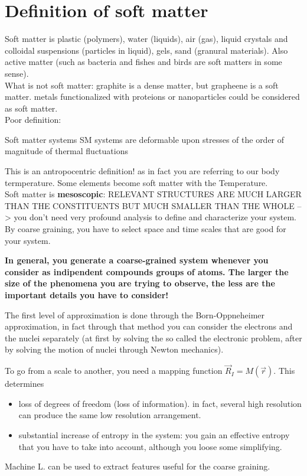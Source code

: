 \chapter{Definition of soft matter}
Soft matter is plastic (polymers), water (liquids), air (gas), liquid crystals
and colloidal suspensions (particles in liquid), gels, sand (granural
materials). Also active matter (such as bacteria and fishes and birds are soft
matters in some sense).\\

What is not soft matter: graphite is a dense matter, but grapheene is a soft
matter. metals functionalized with proteions or nanoparticles could be
considered as soft matter. \\

Poor definition: %
\begin{definition}
    Soft matter systems SM systems are deformable
    upon stresses
    of the order of magnitude
    of thermal fluctuations
    
\end{definition} 
This is an antropocentric definition! as in fact you are referring to our body
termperature. Some elements become soft matter with the Temperature. \\

Soft matter is \textbf{mesoscopic}: RELEVANT STRUCTURES
ARE MUCH LARGER
THAN THE CONSTITUENTS
BUT MUCH SMALLER
THAN THE WHOLE --> you don't need very profound analysis to define and
characterize your system.
By coarse graining, you have to select space and time scales that are good for
your system. \\

\begin{center}
    \textbf{
        In general, you generate a coarse-grained system whenever you consider as
        indipendent compounds groups of atoms. The larger the size of the
        phenomena you are trying to observe, the less are the important details
        you have to consider!
        }    
\end{center}

The first level of approximation is done through the Born-Oppneheimer
approximation, in fact through that method you can consider the electrons and
the nuclei separately (at first by solving the so called the electronic problem,
after by solving the motion of nuclei through Newton mechanics).

To go from a scale to another, you need a mapping function $\vec{R}_I = M(\vec{r})$. This determines
\begin{itemize}
  \item loss of degrees of freedom (loss of information). in fact, several high
  resolution can produce the same low resolution arrangement.
  \item substantial increase of entropy in the system: you gain an effective
  entropy that you have to take into account, although you loose some
  simplifying.
\end{itemize}

Machine L. can be used to extract features useful for the coarse graining.